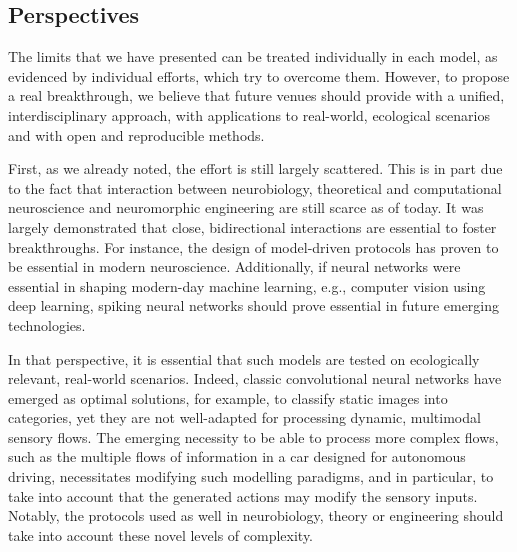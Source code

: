 \documentclass[brainsci, %
               review,accept,pdftex,moreauthors
               ]{Definitions/mdpi}
\begin{document}
\subsection{Perspectives}
%
The limits that we have presented can be treated individually in each model, as evidenced by individual efforts, which try to overcome them. However, to propose a real breakthrough, we believe that future venues should provide with a unified, interdisciplinary approach, with applications to real-world, ecological scenarios and with open and reproducible methods. 

First, as we already noted, the effort is still largely scattered. This is in part due to the fact that interaction between neurobiology, theoretical and computational neuroscience and neuromorphic engineering are still scarce as of today. It was largely demonstrated that close, bidirectional interactions are essential to foster breakthroughs. For instance, the design of model-driven protocols has proven to be essential in modern neuroscience. Additionally, if neural networks were essential in shaping modern-day machine learning, e.g., computer vision using deep learning, spiking neural networks should prove essential in future emerging technologies.

In that perspective, it is essential that such models are tested on ecologically relevant, real-world scenarios. Indeed, classic convolutional neural networks have emerged as optimal solutions, for example, to classify static images into categories, yet they are not well-adapted for processing dynamic, multimodal sensory flows. The emerging necessity to be able to process more complex flows, such as the multiple flows of information in a car designed for autonomous driving, necessitates modifying such modelling paradigms, and in particular, to take into account that the generated actions may modify the sensory inputs. Notably, the protocols used as well in neurobiology, theory or engineering should take into account these novel levels of complexity.
\end{document}
